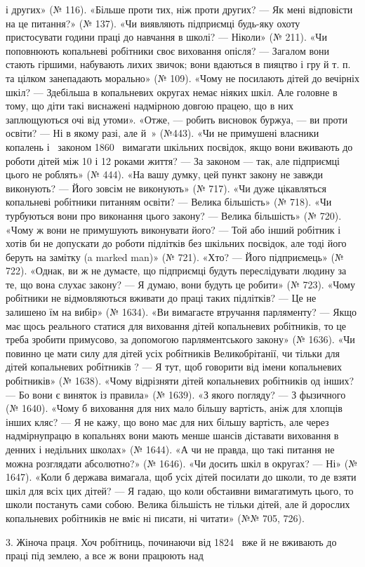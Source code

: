 \parcont{}  %
і других» (№ 116). «Більше проти тих, ніж проти других? — Як
мені відповісти на це питання?» (№ 137). «Чи виявляють підприємці
будь-яку охоту пристосувати години праці до навчання
в школі? — Ніколи» (№ 211). «Чи поповнюють копальневі
робітники своє виховання опісля? — Загалом вони стають гіршими,
набувають лихих звичок; вони вдаються в пияцтво і гру
й т. п. та цілком занепадають морально» (№ 109). «Чому не посилають
дітей до вечірніх шкіл? — Здебільша в копальневих округах
немає ніяких шкіл. Але головне в тому, що діти такі виснажені
надмірною довгою працею, що в них заплющуються очі від утоми».
«Отже, — робить висновок буржуа, — ви проти освіти? — Ні в
якому разі, але й~» (№443). «Чи не примушені власники
копалень і~ законом 1860~ вимагати шкільних посвідок,
якщо вони вживають до роботи дітей між 10 і 12 роками життя? —
За законом — так, але підприємці цього не роблять» (№ 444).
«На вашу думку, цей пункт закону не завжди виконують? —
Його зовсім не виконують» (№ 717). «Чи дуже цікавляться копальневі
робітники питанням освіти? — Велика більшість» (№ 718).
«Чи турбуються вони про виконання цього закону? — Велика
більшість» (№ 720). «Чому ж вони не примушують виконувати
його? — Той або інший робітник і хотів би не допускати до роботи
підлітків без шкільних посвідок, але тоді його беруть на замітку
(a marked man)» (№ 721). «Хто? — Його підприємець» (№ 722).
«Однак, ви ж не думаєте, що підприємці будуть переслідувати
людину за те, що вона слухає закону? — Я думаю, вони будуть
це робити» (№ 723). «Чому робітники не відмовляються вживати
до праці таких підлітків? — Це не залишено їм на вибір» (№ 1634).
«Ви вимагаєте втручання парляменту? — Якщо має щось реального
статися для виховання дітей копальневих робітників, то
це треба зробити примусово, за допомогою парляментського закону»
(№ 1636). «Чи повинно це мати силу для дітей усіх робітників
Великобрітанії, чи тільки для дітей копальневих робітників
? — Я тут, щоб говорити від імени копальневих робітників»
(№ 1638). «Чому відрізняти дітей копальневих робітників од
інших? — Бо вони є виняток із правила» (№ 1639). «З якого
погляду? — З фызичного (№ 1640). «Чому б виховання для них мало більшу вартість,
аніж для хлопців інших кляс? — Я не кажу, що воно має для них більшу вартість,
але через надмірнупрацю в копальнях вони мають менше шансів діставати
виховання в денних і недільних школах» (№ 1644). «А чи не правда, що такі
питання не можна розглядати абсолютно?» (№ 1646). «Чи досить шкіл в округах? —
Ні» (№ 1647). «Коли б держава вимагала, щоб усіх дітей посилати до школи, то де
взяти шкіл для всіх цих дітей? — Я гадаю, що коли обстаивни вимагатимуть цього,
то школи постануть сами собою. Велика більшість не тільки дітей, але й дорослих
копальневих робітників не вміє ні писати, ні читати» (№№ 705, 726).

3. Жіноча праця. Хоч робітниць, починаючи від 1824~ вже
й не вживають до праці під землею, а все ж вони працюють над \parbreak{}  %
